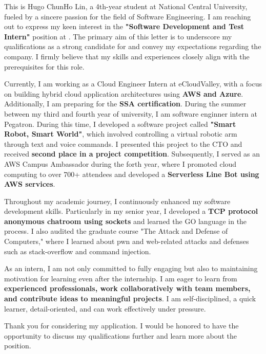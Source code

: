 
This is Hugo ChunHo Lin, a 4th-year student at National Central University, fueled by a sincere passion for the field of Software Engineering.
I am reaching out to express my keen interest in 
the \textbf{"Software Development and Test Intern"} position at 
\company. The primary aim of this letter is to 
underscore my qualifications as a strong candidate 
for \company and convey my expectations regarding 
the company. I firmly believe that my skills and 
experiences closely align with the prerequisites 
for this role.

Currently, I am working as a Cloud Engineer Intern 
at eCloudValley, with a focus on building 
hybrid cloud application architectures using 
\textbf{AWS and Azure}. Additionally, I am preparing 
for the \textbf{SSA certification}. 
During the summer between my third and 
fourth year of university, I am software enginner intern at Pegatron. 
During this time, I developed a software project 
called \textbf{"Smart Robot, Smart World"}, which 
involved controlling a virtual robotic arm 
through text and voice commands. I presented 
this project to the CTO and received 
\textbf{second place in a project competition}. 
Subsequently, I served as an AWS Campus Ambassador 
during the forth year, where I promoted 
cloud computing to over 700+ attendees and 
developed a \textbf{Serverless Line Bot using AWS 
services}.

Throughout my academic journey, I continuously 
enhanced my software development skills. 
Particularly in my senior year, I developed a \textbf{TCP protocol anonymous 
chatroom using sockets} and learned 
the GO language in the process. I also audited the 
graduate course "The Attack and Defense of Computers," 
where I learned about pwn and web-related 
attacks and defenses such as stack-overflow 
and command injection.

As an intern, I am not only committed to fully engaging but also to maintaining motivation for learning even after the internship. I am eager to learn from \textbf{experienced professionals, work collaboratively with team members, and contribute ideas to meaningful projects}. I am self-disciplined, a quick learner, detail-oriented, and can work effectively under pressure.

Thank you for considering my application. I would be honored to have the opportunity to discuss my qualifications further and learn more about the position.
